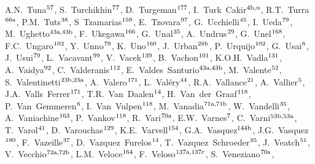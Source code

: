 \begin{flushleft}
A.N.~Tuna$^\textrm{\scriptsize 57}$,    
S.~Turchikhin$^\textrm{\scriptsize 77}$,    
D.~Turgeman$^\textrm{\scriptsize 177}$,    
I.~Turk~Cakir$^\textrm{\scriptsize 4b,u}$,    
R.T.~Turra$^\textrm{\scriptsize 66a}$,    
P.M.~Tuts$^\textrm{\scriptsize 38}$,    
S~Tzamarias$^\textrm{\scriptsize 159}$,    
E.~Tzovara$^\textrm{\scriptsize 97}$,    
G.~Ucchielli$^\textrm{\scriptsize 45}$,    
I.~Ueda$^\textrm{\scriptsize 79}$,    
M.~Ughetto$^\textrm{\scriptsize 43a,43b}$,    
F.~Ukegawa$^\textrm{\scriptsize 166}$,    
G.~Unal$^\textrm{\scriptsize 35}$,    
A.~Undrus$^\textrm{\scriptsize 29}$,    
G.~Unel$^\textrm{\scriptsize 168}$,    
F.C.~Ungaro$^\textrm{\scriptsize 102}$,    
Y.~Unno$^\textrm{\scriptsize 79}$,    
K.~Uno$^\textrm{\scriptsize 160}$,    
J.~Urban$^\textrm{\scriptsize 28b}$,    
P.~Urquijo$^\textrm{\scriptsize 102}$,    
G.~Usai$^\textrm{\scriptsize 8}$,    
J.~Usui$^\textrm{\scriptsize 79}$,    
L.~Vacavant$^\textrm{\scriptsize 99}$,    
V.~Vacek$^\textrm{\scriptsize 139}$,    
B.~Vachon$^\textrm{\scriptsize 101}$,    
K.O.H.~Vadla$^\textrm{\scriptsize 131}$,    
A.~Vaidya$^\textrm{\scriptsize 92}$,    
C.~Valderanis$^\textrm{\scriptsize 112}$,    
E.~Valdes~Santurio$^\textrm{\scriptsize 43a,43b}$,    
M.~Valente$^\textrm{\scriptsize 52}$,    
S.~Valentinetti$^\textrm{\scriptsize 23b,23a}$,    
A.~Valero$^\textrm{\scriptsize 171}$,    
L.~Val\'ery$^\textrm{\scriptsize 44}$,    
R.A.~Vallance$^\textrm{\scriptsize 21}$,    
A.~Vallier$^\textrm{\scriptsize 5}$,    
J.A.~Valls~Ferrer$^\textrm{\scriptsize 171}$,    
T.R.~Van~Daalen$^\textrm{\scriptsize 14}$,    
H.~Van~der~Graaf$^\textrm{\scriptsize 118}$,    
P.~Van~Gemmeren$^\textrm{\scriptsize 6}$,    
I.~Van~Vulpen$^\textrm{\scriptsize 118}$,    
M.~Vanadia$^\textrm{\scriptsize 71a,71b}$,    
W.~Vandelli$^\textrm{\scriptsize 35}$,    
A.~Vaniachine$^\textrm{\scriptsize 163}$,    
P.~Vankov$^\textrm{\scriptsize 118}$,    
R.~Vari$^\textrm{\scriptsize 70a}$,    
E.W.~Varnes$^\textrm{\scriptsize 7}$,    
C.~Varni$^\textrm{\scriptsize 53b,53a}$,    
T.~Varol$^\textrm{\scriptsize 41}$,    
D.~Varouchas$^\textrm{\scriptsize 129}$,    
K.E.~Varvell$^\textrm{\scriptsize 154}$,    
G.A.~Vasquez$^\textrm{\scriptsize 144b}$,    
J.G.~Vasquez$^\textrm{\scriptsize 180}$,    
F.~Vazeille$^\textrm{\scriptsize 37}$,    
D.~Vazquez~Furelos$^\textrm{\scriptsize 14}$,    
T.~Vazquez~Schroeder$^\textrm{\scriptsize 35}$,    
J.~Veatch$^\textrm{\scriptsize 51}$,    
V.~Vecchio$^\textrm{\scriptsize 72a,72b}$,    
L.M.~Veloce$^\textrm{\scriptsize 164}$,    
F.~Veloso$^\textrm{\scriptsize 137a,137c}$,    
S.~Veneziano$^\textrm{\scriptsize 70a}$,    

\end{flushleft}
